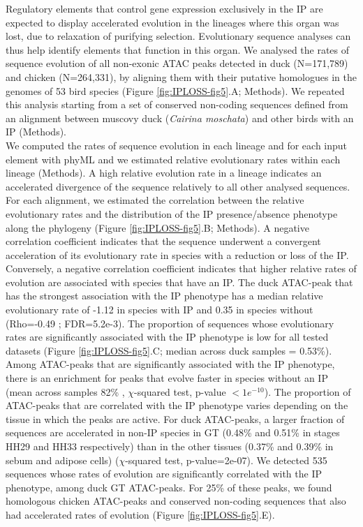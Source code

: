 Regulatory elements that control gene expression exclusively in the IP are expected to display accelerated evolution in the lineages where this organ was lost, due to relaxation of purifying selection. Evolutionary sequence analyses can thus help identify elements that function in this organ. We analysed the rates of sequence evolution of all non-exonic ATAC peaks detected in duck (N=171,789) and chicken (N=264,331), by aligning them with their putative homologues in the genomes of 53 bird species (Figure \ref{fig:IPLOSS-fig5}.A; Methods). We repeated this analysis   starting from a set of conserved non-coding sequences defined from an alignment between muscovy duck (\textit{Cairina moschata}) and other birds with an IP (Methods). \\


We computed the rates of sequence evolution in each lineage and for each input element with phyML and we estimated relative evolutionary rates within each lineage (Methods). A high relative evolution rate in a lineage indicates an accelerated divergence of the sequence relatively to all other analysed sequences. For each alignment, we estimated the correlation between the relative evolutionary rates and the distribution of the IP presence/absence phenotype along the phylogeny (Figure \ref{fig:IPLOSS-fig5}.B; Methods). A negative correlation coefficient indicates that the sequence underwent a convergent acceleration of its evolutionary rate in species with a reduction or loss of the IP. Conversely, a negative correlation coefficient indicates that higher relative rates of evolution are associated with species that have an IP.   The duck ATAC-peak that has the strongest association with the IP phenotype has a median relative evolutionary rate of -1.12 in species with IP and 0.35 in species without (Rho=-0.49 ; FDR=5.2e-3). The proportion of sequences whose evolutionary rates are significantly associated with the IP phenotype is low for all tested datasets (Figure \ref{fig:IPLOSS-fig5}.C; median across duck samples = 0.53\%). 
Among ATAC-peaks that are significantly associated with the IP phenotype, there is an enrichment for peaks that evolve faster in species without an IP (mean across samples 82\% , $\chi$-squared test, p-value $<1e^{-10}$). The proportion of ATAC-peaks that are correlated with the IP phenotype varies depending on the tissue in which the peaks are active. For duck ATAC-peaks, a larger fraction of sequences are accelerated in non-IP species in GT (0.48\% and 0.51\% in stages HH29 and HH33 respectively) than in the other tissues (0.37\% and 0.39\% in sebum and adipose cells) ($\chi$-squared test, p-value=2e-07). We detected 535 sequences whose rates of evolution are significantly correlated with the IP phenotype, among duck GT ATAC-peaks. For 25\% of these peaks, we found homologous chicken ATAC-peaks and conserved non-coding sequences that also had accelerated rates of evolution (Figure \ref{fig:IPLOSS-fig5}.E).\\

